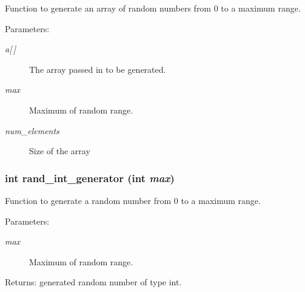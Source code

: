 Function to generate an array of random numbers from 0 to a maximum range. \begin{Desc}
\item[Parameters:]
\begin{description}
\item[{\em a\mbox{[}$\,$\mbox{]}}]The array passed in to be generated. \item[{\em max}]Maximum of random range. \item[{\em num\_\-elements}]Size of the array \end{description}
\end{Desc}
\subsubsection{\setlength{\rightskip}{0pt plus 5cm}int rand\_\-int\_\-generator (int {\em max})}\label{sort_8c_935f575e11a2bfdcb3968c2e51a322b8}


Function to generate a random number from 0 to a maximum range. \begin{Desc}
\item[Parameters:]
\begin{description}
\item[{\em max}]Maximum of random range. \end{description}
\end{Desc}
\begin{Desc}
\item[Returns:]generated random number of type int. \end{Desc}
